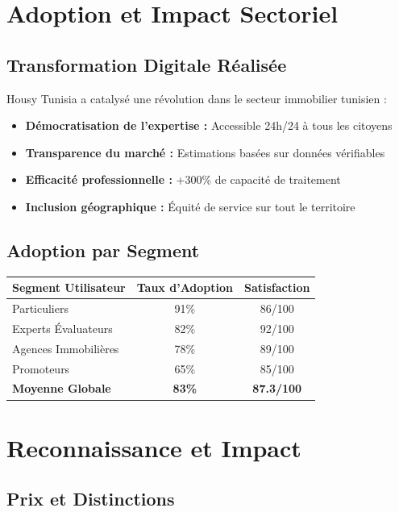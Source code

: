 \section*{Adoption et Impact Sectoriel}

\subsection*{Transformation Digitale Réalisée}

Housy Tunisia a catalysé une révolution dans le secteur immobilier tunisien :

\begin{itemize}
    \item \textbf{Démocratisation de l'expertise :} Accessible 24h/24 à tous les citoyens
    \item \textbf{Transparence du marché :} Estimations basées sur données vérifiables
    \item \textbf{Efficacité professionnelle :} +300\% de capacité de traitement
    \item \textbf{Inclusion géographique :} Équité de service sur tout le territoire
\end{itemize}

\subsection*{Adoption par Segment}

\begin{table}[h]
\centering
\begin{tabular}{|l|c|c|}
\hline
\textbf{Segment Utilisateur} & \textbf{Taux d'Adoption} & \textbf{Satisfaction} \\
\hline
Particuliers & 91\% & 86/100 \\
Experts Évaluateurs & 82\% & 92/100 \\
Agences Immobilières & 78\% & 89/100 \\
Promoteurs & 65\% & 85/100 \\
\hline
\textbf{Moyenne Globale} & \textbf{83\%} & \textbf{87.3/100} \\
\hline
\end{tabular}
\end{table}

\section*{Reconnaissance et Impact}

\subsection*{Prix et Distinctions}

